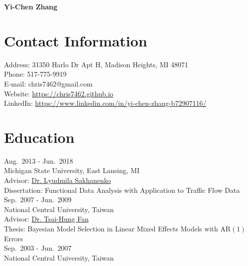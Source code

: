 \documentclass[a4paper,10pt,dvipdfmx]{article}
\begin{document}
\begin{center}
  {\huge {\bf Yi-Chen Zhang}}
\end{center}

\section*{Contact Information}
\indent Address: 31350 Harlo Dr Apt H, Madison Heights, MI 48071\\
\indent Phone: 517-775-9919\\
\indent E-mail: chris7462@gmail.com\\
\indent Website: \href{https://chris7462.github.io}{https://chris7462.github.io}\\
\indent LinkedIn: \href{https://www.linkedin.com/in/yi-chen-zhang-b72907116/}{https://www.linkedin.com/in/yi-chen-zhang-b72907116/}

\section*{Education}
\hfill Aug.~2013 - Jun.~2018\\
\indent Michigan State University, East Lansing, MI\\
\indent Advisor: \href{https://www.stt.msu.edu/users/luda/}{Dr. Lyudmila Sakhanenko}\\
\indent Dissertation: Functional Data Analysis with Application to Traffic Flow Data\\

\hfill Sep.~2007 - Jun.~2009\\
\indent National Central University, Taiwan\\
\indent Advisor: \href{http://www.stat.ncu.edu.tw/teacher/THFan/index.htm}{Dr. Tsai-Hung Fan}\\
\indent Thesis: Bayesian Model Selection in Linear Mixed Effects Models with AR$(1)$ Errors\\

\hfill Sep.~2003 - Jun.~2007\\
\indent National Central University, Taiwan
\end{document}
